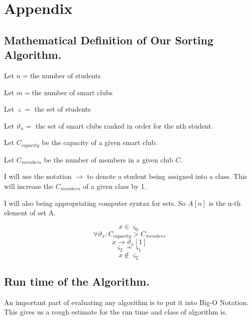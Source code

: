 \documentclass{article}
\begin{document}
\section{Appendix}
\subsection{Mathematical Definition of Our Sorting Algorithm. }
Let $n = $the number of students

Let $m = $the number of smart clubs

Let $\varsigma = $ the set of students

Let $\vartheta_n = $ the set of smart clubs ranked in order for the nth student.

Let $ C_{capacity} $ be the capacity of a given smart club. 

Let $ C_{members} $ be the number of members in a given club $C$.

I will use the notation $\rightarrow$ to denote a student being assigned into a class. This will increase the $C_{members}$ of a given class 
by 1.

I will also being appropriating computer syntax for sets. So $A[n]$ is the n-th element of set A.  

\begin{equation}x \in \varsigma_0 \end{equation}
\begin{equation}
\forall \vartheta_x: C_{capacity} > C_{members} 
\end{equation}
\begin{equation}
x \rightarrow \vartheta_x[1]
\end{equation}
\begin{equation}
\varsigma_2 = \varsigma_1
\end{equation}
\begin{equation}
x \notin \varsigma_2
\end{equation}

\subsection{Run time of the Algorithm.}
An important part of evaluating any algorithm is to put it into Big-O Notation. This gives us a rough estimate for the run time and class of 
algorithm is. 
\end{document}
